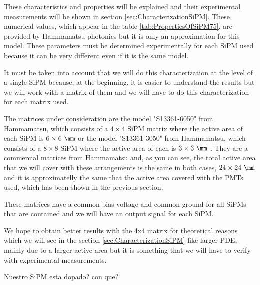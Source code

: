 These characteristics and properties will be explained and their experimental measurements will be shown in section \ref{sec:CharacterizationSiPM}. These numerical values, which appear in the table \ref{tab:PropertiesOfSiPM75}, are provided by Hammamatsu photonics but it is only an approximation for this model. These parameters must be determined experimentally for each SiPM used because it can be very different even if it is the same model.

It must be taken into account that we will do this characterization at the level of a single SiPM because, at the beginning, it is easier to understand the results but we will work with a matrix of them and we will have to do this characterization for each matrix used. 

The matrices under consideration are the model "S13361-6050" from Hammamatsu, which consists of a $4\times 4$ SiPM matrix where the active area of each SiPM is $6\times 6~\mm$ \cite{DataSheetHammamatsu_array_SiPM_6050} or the model "S13361-3050" from Hammamatsu, which consists of a $8\times 8$ SiPM where the active area of each is $3\times 3~\mm$ \cite{DataSheetHammamatsu_array_SiPM_3050}. They are a commercial matrices from Hammamatsu and, as you can see, the total active area that we will cover with these arrangements is the same in both cases, $24\times 24~\mm$ and it is approximatelly the same that the active area covered with the PMTs used, which has been shown in the previous section.

These matrices have a common bias voltage and common ground for all SiPMs that are contained and we will have an output signal for each SiPM. 

We hope to obtain better results with the 4x4 matrix for theoretical reasons which we will see in the section \ref{sec:CharacterizationSiPM} like larger PDE, mainly due to a larger active area but it is something that we will have to verify with experimental measurements.




Nuestro SiPM esta dopado? con que?